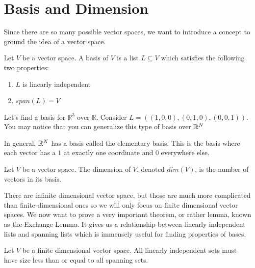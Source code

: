 \section{Basis and Dimension}
Since there are so many possible vector spaces, we want to introduce a concept to ground the idea of a vector space.
\begin{definition}
    Let $V$ be a vector space. A basis of $V$ is a list $L\subseteq V$ which satisfies the following two properties:
    \begin{enumerate}
        \item $L$ is linearly independent
        \item $span(L)=V$
    \end{enumerate}
\end{definition}
\begin{example}
    Let's find a basis for $\mathbb{R}^3$ over $\mathbb{R}$. Consider $L=((1,0,0),(0,1,0),(0,0,1))$. You may notice that you can generalize this type of basis over $\mathbb{R}^N$
\end{example}
\begin{remark}
    In general, $\mathbb{R}^N$ has a basis called the elementary basis. This is the basis where each vector has a $1$ at exactly one coordinate and $0$ everywhere else.
\end{remark}
\begin{definition}
    Let $V$ be a vector space. The dimension of $V$, denoted $dim(V)$, is the number of vectors in its basis.
\end{definition}
There are infinite dimensional vector space, but those are much more complicated than finite-dimensional ones so we will only focus on finite dimensional vector spaces. We now want to prove a very important theorem, or rather lemma, known as the Exchange Lemma. It gives us a relationship between linearly independent lists and spanning lists which is immensely useful for finding properties of bases.
\begin{theorem}
    Let $V$ be a finite dimensional vector space. All linearly independent sets must have size less than or equal to all spanning sets.
\end{theorem}
